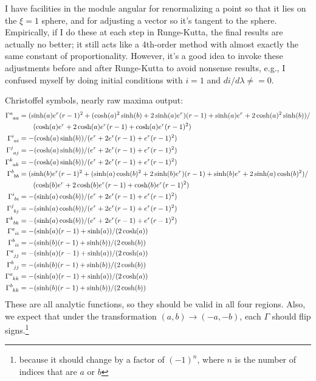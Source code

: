 \documentclass{article}
\begin{document}
I have facilities in the module angular for renormalizing a point so that it lies on the
$\xi=1$ sphere, and for adjusting a vector so it's tangent to the sphere. Empirically,
if I do these at each step in Runge-Kutta, the final results are actually no better; it
still acts like a 4th-order method with almost exactly the same constant of proportionality.
However, it's a good idea to invoke these adjustments before and after Runge-Kutta to avoid
nonsense results, e.g., I confused myself by doing initial conditions with $i=1$ and
$di/d\lambda\ne=0$.

Christoffel symbols, nearly raw maxima output:
\begin{align*}
\Gamma\indices{^a_a_a} &= (\sinh(a)e^r(r-1)^2+(\cosh(a)^2\sinh(b)+2\sinh(a)e^r)(r-1)+\sinh(a)e^r+2\cosh(a)^2\sinh(b))/ \\
                       & \qquad (\cosh(a)e^r+2\cosh(a)e^r(r-1)+\cosh(a)e^r(r-1)^2)  \\
\Gamma\indices{^i_a_i} &= -(\cosh(a)\sinh(b))/(e^r+2e^r(r-1)+e^r(r-1)^2)  \\
\Gamma\indices{^j_a_j} &= -(\cosh(a)\sinh(b))/(e^r+2e^r(r-1)+e^r(r-1)^2)  \\
\Gamma\indices{^k_a_k} &= -(\cosh(a)\sinh(b))/(e^r+2e^r(r-1)+e^r(r-1)^2)  \\
\Gamma\indices{^b_b_b} &= (\sinh(b)e^r(r-1)^2+(\sinh(a)\cosh(b)^2+2\sinh(b)e^r)(r-1)+\sinh(b)e^r+2\sinh(a)\cosh(b)^2)/ \\
                       & \qquad (\cosh(b)e^r+2\cosh(b)e^r(r-1)+\cosh(b)e^r(r-1)^2)  \\
\Gamma\indices{^i_b_i} &= -(\sinh(a)\cosh(b))/(e^r+2e^r(r-1)+e^r(r-1)^2)  \\
\Gamma\indices{^j_b_j} &= -(\sinh(a)\cosh(b))/(e^r+2e^r(r-1)+e^r(r-1)^2)  \\
\Gamma\indices{^k_b_k} &= -(\sinh(a)\cosh(b))/(e^r+2e^r(r-1)+e^r(r-1)^2)  \\
\Gamma\indices{^a_i_i} &= -(\sinh(a)(r-1)+\sinh(a))/(2\cosh(a))  \\
\Gamma\indices{^b_i_i} &= -(\sinh(b)(r-1)+\sinh(b))/(2\cosh(b))  \\
\Gamma\indices{^a_j_j} &= -(\sinh(a)(r-1)+\sinh(a))/(2\cosh(a))  \\
\Gamma\indices{^b_j_j} &= -(\sinh(b)(r-1)+\sinh(b))/(2\cosh(b))  \\
\Gamma\indices{^a_k_k} &= -(\sinh(a)(r-1)+\sinh(a))/(2\cosh(a))  \\
\Gamma\indices{^b_k_k} &= -(\sinh(b)(r-1)+\sinh(b))/(2\cosh(b))  \\
\end{align*}
These are all analytic functions, so they should be valid in all four regions. Also, we expect that
under the transformation $(a,b)\rightarrow(-a,-b)$, each $\Gamma$ should flip signs.\footnote{because it
should change by a factor of $(-1)^n$, where $n$ is the number of indices that are $a$ or $b$}
\end{document}
